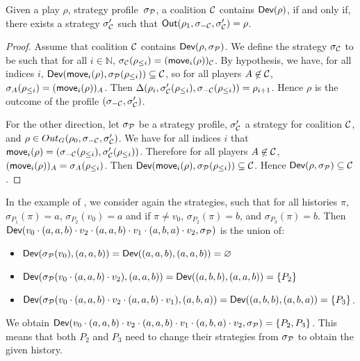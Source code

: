\begin{lemma}\label{13-lem:deviator}
Given a play \(\rho\), strategy profile~$\sigma_{\mathcal{P}}$, a coalition \(\mathcal{C}\)
contains \(\textsf{Dev}(\rho)\), if and only if, there exists a strategy
\(\sigma'_{\mathcal{C}}\) such that \(\textsf{Out}(\rho_1, \sigma_{-\mathcal{C}}, \sigma'_{\mathcal{C}}) = \rho\).
\end{lemma}
\begin{proof}
Assume that coalition \(\mathcal{C}\) contains
\(\textsf{Dev}(\rho, \sigma_{\mathcal{P}})\). We define the strategy \(\sigma_{\mathcal{C}}\) to be
such that for all \(i\in \mathbb{N}\),
\(\sigma_{\mathcal{C}}(\rho_{\le i} ) = (\textsf{move}_i(\rho))_{\mathcal{C}}\). By hypothesis, we have,
for all indices \(i\),
\(\textsf{Dev}(\textsf{move}_i(\rho), \sigma_{\mathcal{P}}(\rho_{\leq i})) \subseteq \mathcal{C}\), so for
all players \(A\not\in \mathcal{C}\),
\(\sigma_A(\rho_{\le i}) = (\textsf{move}_i(\rho))_A\). Then
\(\Delta(\rho_i, \sigma'_{\mathcal{C}}(\rho_{\le i}), \sigma_{-\mathcal{C}}(\rho_{\le i})) = \rho_{i+1}\).
Hence \(\rho\) is the outcome of the profile
\((\sigma_{-\mathcal{C}}, \sigma'_{\mathcal{C}})\).

For the other direction, let \(\sigma_{\mathcal{P}}\) be a strategy profile,
\(\sigma'_{\mathcal{C}}\) a strategy for coalition \(\mathcal{C}\), and
\(\rho \in Out_G(\rho_0 , \sigma_{-\mathcal{C}}, \sigma'_{\mathcal{C}})\). We have for all
indices \(i\) that
\(\textsf{move}_i(\rho) = (\sigma_{-\mathcal{C}}(\rho_{\le i}), \sigma'_{\mathcal{C}}(\rho_{\le i}))\).
Therefore for all players \(A \not\in \mathcal{C}\),
\((\textsf{move}_i(\rho))_A = \sigma_A(\rho_{\le i})\). Then
\(\textsf{Dev}(\textsf{move}_i(\rho), \sigma_{\mathcal{P}}(\rho_{\le i})) \subseteq \mathcal{C}\). Hence
\(\textsf{Dev}(\rho, \sigma_{\mathcal{P}}) \subseteq \mathcal{C}\).
\end{proof}

\begin{example}
  In the example of , we consider again the strategies,
  such that for all histories $\pi$, $\sigma_{P_1}(\pi) = a$,
  $\sigma_{P_2}(v_0) = a$ and if $\pi \ne v_0$, $\sigma_{P_2}(\pi) = b$,
  and $\sigma_{P_3}(\pi) = b$.
  Then $\textsf{Dev}(v_0 \cdot (a, a, b) \cdot v_2 \cdot (a, a, b) \cdot v_1 \cdot
  (a, b, a) \cdot v_2, \sigma_{\mathcal{P}})$ is the union of:
  \begin{itemize}
  \item $\textsf{Dev}(\sigma_{\mathcal{P}}(v_0), (a, a, b)) = \textsf{Dev}((a, a, b), (a, a, b)) = \varnothing$
  \item $\textsf{Dev}(\sigma_{\mathcal{P}}(v_0 \cdot (a, a, b) \cdot v_2), (a, a, b)) =
    \textsf{Dev}( (a, b, b), (a, a, b)) = \{P_2\}$
  \item $\textsf{Dev}(\sigma_{\mathcal{P}}(v_0 \cdot (a, a, b) \cdot v_2 \cdot (a, a, b) \cdot v_1), (a, b, a)) =
    \textsf{Dev}( (a, b, b), (a, b, a)) = \{P_3\}$.
  \end{itemize}
  We obtain
  $\textsf{Dev}(v_0 \cdot (a, a, b) \cdot v_2 \cdot (a, a, b) \cdot v_1 \cdot
  (a, b, a) \cdot v_2, \sigma_{\mathcal{P}}) = \{ P_2, P_3\}$.
  This means that both $P_2$ and $P_3$ need to change their strategies
  from $\sigma_{\mathcal{P}}$ to obtain the given history.
\end{example}

